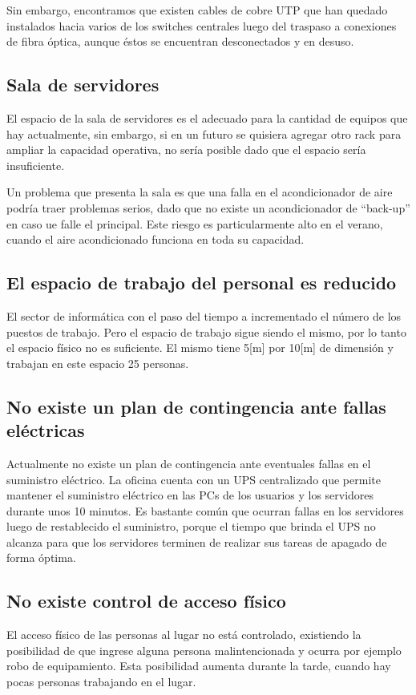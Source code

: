 \documentclass[a4paper,11pt,oneside]{article}
\begin{document}
Sin embargo, encontramos que existen cables de cobre UTP que han
quedado instalados hacia varios de los switches centrales luego del
traspaso a conexiones de fibra óptica, aunque éstos se encuentran
desconectados y en desuso.
%
\subsection*{Sala de servidores}
El espacio de la sala de servidores es el adecuado para la cantidad de
equipos que hay actualmente, sin embargo, si en un futuro se quisiera
agregar otro rack para ampliar la capacidad operativa, no sería
posible dado que el espacio sería insuficiente.

Un problema que presenta la sala es que una falla en el acondicionador
de aire podría traer problemas serios, dado que no existe un
acondicionador de ``back-up'' en caso ue falle el principal. Este
riesgo es particularmente alto en el verano, cuando el aire
acondicionado funciona en toda su capacidad.
%
\subsection*{El espacio de trabajo del personal es reducido}
El sector de informática con el paso del tiempo a incrementado el
número de los puestos de trabajo. Pero el espacio de trabajo sigue
siendo el mismo, por lo tanto el espacio físico no es suficiente. El
mismo tiene 5[m] por 10[m] de dimensión y trabajan en este espacio 25
personas.
%
\subsection*{No existe un plan de contingencia ante fallas eléctricas}
Actualmente no existe un plan de contingencia ante eventuales fallas
en el suministro eléctrico. La oficina cuenta con un UPS centralizado
que permite mantener el suministro eléctrico en las PCs de los
usuarios y los servidores durante unos 10 minutos. Es bastante común
que ocurran fallas en los servidores luego de restablecido el
suministro, porque el tiempo que brinda el UPS no alcanza para que los
servidores terminen de realizar sus tareas de apagado de forma óptima.
%
\subsection*{No existe control de acceso físico}
El acceso físico de las personas al lugar no está controlado,
existiendo la posibilidad de que ingrese alguna persona
malintencionada y ocurra por ejemplo robo de equipamiento. Esta
posibilidad aumenta durante la tarde, cuando hay pocas personas
trabajando en el lugar.
\end{document}
